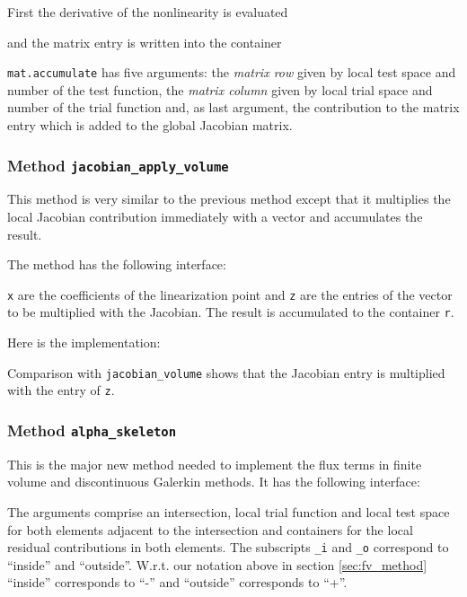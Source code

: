 \documentclass[a4paper,12pt]{article}
\begin{document}
First the derivative of the nonlinearity is evaluated

and the matrix entry is written into the container

\lstinline{mat.accumulate} has five arguments:
the \textit{matrix row} given by local test space and number of the
test function, the \textit{matrix column} given by local trial space and
number of the trial function and, as last argument, the contribution to
the matrix entry which is added to the global Jacobian matrix.

\subsubsection*{Method \lstinline{jacobian_apply_volume}}

This method is very similar to the previous method except that
it multiplies the local Jacobian contribution immediately with a vector
and accumulates the result.

The method has the following interface:

\lstinline{x} are the coefficients of the linearization point and
\lstinline{z} are the entries of the vector to be multiplied with the 
Jacobian. The result is accumulated to the container \lstinline{r}.

Here is the implementation:

Comparison with \lstinline{jacobian_volume} shows that
the Jacobian entry is multiplied with the entry of \lstinline{z}.

\subsubsection*{Method \lstinline{alpha_skeleton}}

This is the major new method needed to implement the flux terms
in finite volume and discontinuous Galerkin methods. It
has the following interface:

The arguments comprise an intersection, local trial function
and local test space for both elements adjacent to the intersection
and containers for the local residual contributions in both elements.
The subscripts \lstinline{_i} and \lstinline{_o} correspond to
``inside'' and ``outside''. W.r.t. our notation above in section \ref{sec:fv_method}
``inside'' corresponds to ``-'' and ``outside'' corresponds to ``+''.
\end{document}
